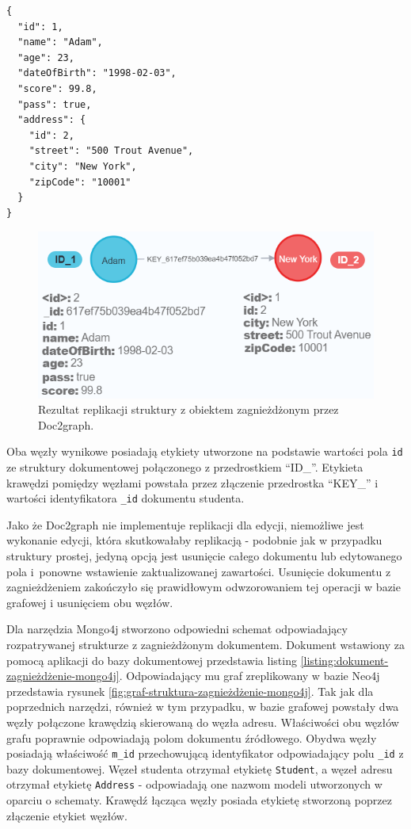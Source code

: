 \documentclass[a4paper,twoside,12pt]{book}
\begin{document}
\begin{lstlisting}[style=JSON, caption={Struktura dokumentu z obiektem zagnieżdżonym dla Doc2graph.}, label={listing:json-zagnieżdżenie-doc2graph}, captionpos=b]
{
  "id": 1,
  "name": "Adam",
  "age": 23,
  "dateOfBirth": "1998-02-03",
  "score": 99.8,
  "pass": true,
  "address": {
    "id": 2,
    "street": "500 Trout Avenue",
    "city": "New York",
    "zipCode": "10001"
  }
}
\end{lstlisting}

\begin{figure}[!h]
\centering
\captionsetup{justification=centering}
\includegraphics[width=12cm]{images/zagnieżdżenie_doc2graph.png}
\caption{Rezultat replikacji struktury z obiektem zagnieżdżonym przez Doc2graph.}
\label{fig:graf-struktura-zagnieżdżenie-doc2graph}
\end{figure}

Oba węzły wynikowe posiadają etykiety utworzone na podstawie wartości pola \texttt{id} ze struktury dokumentowej połączonego z przedrostkiem ``ID\_''. Etykieta krawędzi pomiędzy węzłami powstała przez złączenie przedrostka ``KEY\_'' i wartości identyfikatora \texttt{\_id} dokumentu studenta.

Jako że Doc2graph nie implementuje replikacji dla edycji, niemożliwe jest wykonanie edycji, która skutkowałaby replikacją - podobnie jak w przypadku struktury prostej, jedyną opcją jest usunięcie całego dokumentu lub edytowanego pola i~ponowne wstawienie zaktualizowanej zawartości. Usunięcie dokumentu z zagnieżdżeniem zakończyło się prawidłowym odwzorowaniem tej operacji w bazie grafowej i usunięciem obu węzłów.

Dla narzędzia Mongo4j stworzono odpowiedni schemat odpowiadający rozpatrywanej strukturze z zagnieżdżonym dokumentem. Dokument wstawiony za pomocą aplikacji do bazy dokumentowej przedstawia listing \ref{listing:dokument-zagnieżdżenie-mongo4j}. Odpowiadający mu graf zreplikowany w bazie Neo4j przedstawia rysunek \ref{fig:graf-struktura-zagnieżdżenie-mongo4j}. Tak jak dla poprzednich narzędzi, również w tym przypadku, w bazie grafowej powstały dwa węzły połączone krawędzią skierowaną do węzła adresu. Właściwości obu węzłów grafu poprawnie odpowiadają polom dokumentu źródłowego. Obydwa węzły posiadają właściwość \texttt{m\_id} przechowującą identyfikator odpowiadający polu \texttt{\_id} z bazy dokumentowej. Węzeł studenta otrzymał etykietę \texttt{Student}, a węzeł adresu otrzymał etykietę \texttt{Address} - odpowiadają one nazwom modeli utworzonych w oparciu o schematy. Krawędź łącząca węzły posiada etykietę stworzoną poprzez złączenie etykiet węzłów.
\end{document}
